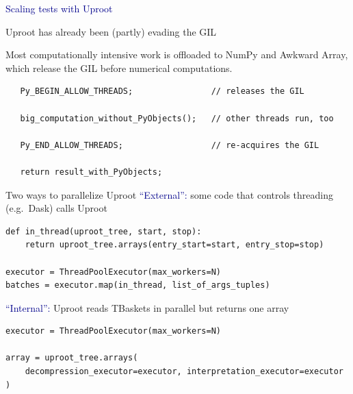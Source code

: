 \documentclass[aspectratio=169]{beamer}
\begin{document}
\begin{frame}
\vspace{1 cm}
\LARGE
\begin{center}
\textcolor{darkblue}{Scaling tests with Uproot}
\end{center}
\end{frame}

\begin{frame}[fragile]{Uproot has already been (partly) evading the GIL}
\large
\vspace{0.7 cm}

Most computationally intensive work is offloaded to NumPy and Awkward Array, which release the GIL before numerical computations.

\small
\vspace{0.1 cm}
\begin{verbatim}
   Py_BEGIN_ALLOW_THREADS;                // releases the GIL

   big_computation_without_PyObjects();   // other threads run, too

   Py_END_ALLOW_THREADS;                  // re-acquires the GIL

   return result_with_PyObjects;
\end{verbatim}

\large
\vspace{0.4 cm}

\vspace{0.4 cm}
\end{frame}

\begin{frame}[fragile]{Two ways to parallelize Uproot}
\large
\vspace{1 cm}
\hspace{-0.5 cm}\textcolor{darkblue}{``External'':} some code that controls threading (e.g.\ Dask) calls Uproot

\small
\vspace{0.1 cm}
\begin{verbatim}
def in_thread(uproot_tree, start, stop):
    return uproot_tree.arrays(entry_start=start, entry_stop=stop)

executor = ThreadPoolExecutor(max_workers=N)
batches = executor.map(in_thread, list_of_args_tuples)
\end{verbatim}

\large
\vspace{0.5 cm}

\hspace{-0.5 cm}\textcolor{darkblue}{``Internal'':} Uproot reads TBaskets in parallel but returns one array

\small
\vspace{0.1 cm}
\begin{verbatim}
executor = ThreadPoolExecutor(max_workers=N)

array = uproot_tree.arrays(
    decompression_executor=executor, interpretation_executor=executor
)
\end{verbatim}
\end{frame}
\end{document}

